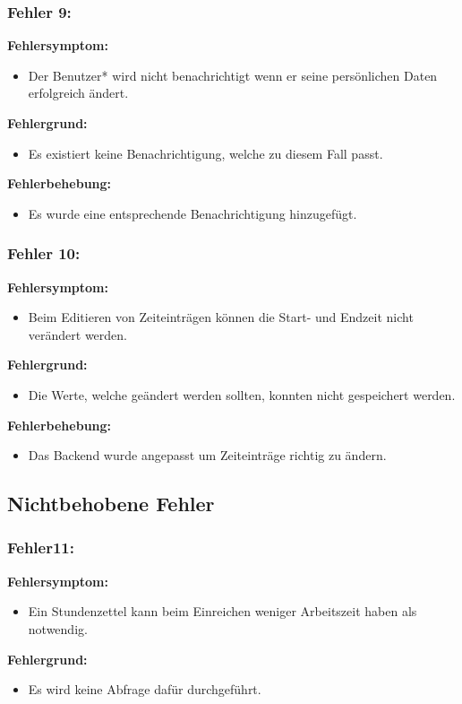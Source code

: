 \subsubsection{Fehler 9:}%
\textbf{Fehlersymptom:}
	\begin{itemize}
		\item Der Benutzer* wird nicht benachrichtigt wenn er seine persönlichen Daten erfolgreich ändert.
	\end{itemize}
\textbf{Fehlergrund:}
	\begin{itemize}
		\item Es existiert keine Benachrichtigung, welche zu diesem Fall passt.
	\end{itemize}
\textbf{Fehlerbehebung:}
	\begin{itemize}
		\item Es wurde eine entsprechende Benachrichtigung hinzugefügt.
	\end{itemize}

\subsubsection{Fehler 10:}%
\textbf{Fehlersymptom:}
	\begin{itemize}
		\item Beim Editieren von Zeiteinträgen können die Start- und Endzeit nicht verändert werden.
	\end{itemize}
\textbf{Fehlergrund:}
	\begin{itemize}
		\item Die Werte, welche geändert werden sollten, konnten nicht gespeichert werden.
	\end{itemize}
\textbf{Fehlerbehebung:}
	\begin{itemize}
		\item Das Backend wurde angepasst um Zeiteinträge richtig zu ändern.
	\end{itemize}

\newpage

\subsection{Nichtbehobene Fehler}

\subsubsection{Fehler11:}%
\textbf{Fehlersymptom:}
	\begin{itemize}
		\item Ein Stundenzettel kann beim Einreichen weniger Arbeitszeit haben als notwendig.
	\end{itemize}
\textbf{Fehlergrund:}
	\begin{itemize}
		\item Es wird keine Abfrage dafür durchgeführt.
	\end{itemize}
	
